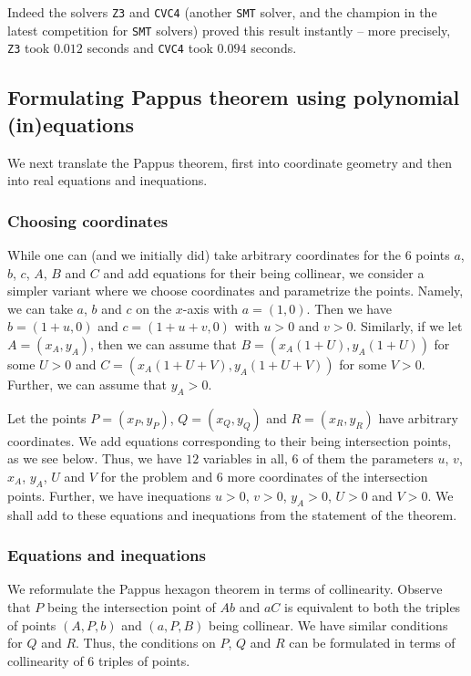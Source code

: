 \documentclass{amsart}
\theoremstyle{plain}
\theoremstyle{definition}
\theoremstyle{remark}
\begin{document}
Indeed the solvers \texttt{Z3} and \texttt{CVC4} (another \texttt{SMT} solver, and the champion in the
latest competition for \texttt{SMT} solvers) proved this result instantly -- more
precisely, \texttt{Z3} took \(0.012\) seconds and \texttt{CVC4} took \(0.094\) seconds.

\subsection{Formulating Pappus theorem using polynomial (in)equations}

We next translate the Pappus theorem, first into coordinate geometry and then into
real equations and inequations.

\subsubsection{Choosing coordinates}

While one can (and we initially did) take arbitrary coordinates for the
\(6\) points \(a\), \(b\), \(c\), \(A\), \(B\) and \(C\) and add
equations for their being collinear, we consider a simpler variant where
we choose coordinates and parametrize the points. Namely, we can take
\(a\), \(b\) and \(c\) on the \(x\)-axis with \(a = (1, 0)\). Then we have
\(b = (1 + u, 0)\) and \(c = (1 + u + v, 0)\) with \(u>0\) and \(v>0\).
Similarly, if we let \(A = (x_A, y_A)\), then we can assume that
\(B = (x_A(1+ U), y_A(1 + U))\) for some \(U > 0\) and
\(C = (x_A(1+ U + V), y_A(1 + U + V))\) for some \(V > 0\). Further, we
can assume that \(y_A > 0\).

Let the points \(P= (x_P, y_P)\), \(Q = (x_Q, y_Q)\) and
\(R= (x_R, y_R)\) have arbitrary coordinates. We add equations
corresponding to their being intersection points, as we see below. Thus,
we have \(12\) variables in all, \(6\) of them the parameters \(u\),
\(v\), \(x_A\), \(y_A\), \(U\) and \(V\) for the problem and \(6\) more
coordinates of the intersection points. Further, we have inequations
\(u >0\), \(v >0\), \(y_A >0\), \(U > 0\) and \(V >0\). We shall add to
these equations and inequations from the statement of the theorem.

\subsubsection{Equations and inequations}

We reformulate the Pappus hexagon theorem in terms of collinearity.
Observe that \(P\) being the intersection point of \(Ab\) and \(aC\) is
equivalent to both the triples of points \((A, P, b)\) and \((a, P, B)\)
being collinear. We have similar conditions for \(Q\) and \(R\). Thus,
the conditions on \(P\), \(Q\) and \(R\) can be formulated in terms of
collinearity of \(6\) triples of points.
\end{document}
